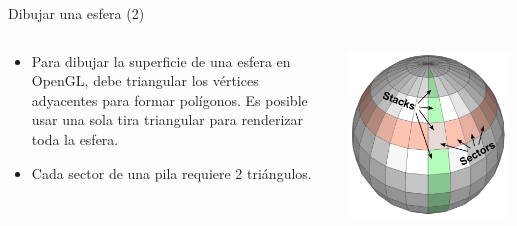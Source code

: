 \documentclass[aspectratio=169,compress]{beamer}
\begin{document}
\begin{frame}{Dibujar una esfera (2)}
\begin{columns}
\begin{column}{0.4\textwidth}
\begin{itemize}
\item Para dibujar la superficie de una esfera en OpenGL, debe triangular los vértices adyacentes para formar polígonos. Es posible usar una sola tira triangular para renderizar toda la esfera.
\item Cada sector de una pila requiere 2 triángulos.
\end{itemize}

\end{column}
\begin{column}{0.3\textwidth}
\begin{center}
 \includegraphics[width=0.98\textwidth]{FigsOpenGL/gl_sphere02}
 \end{center}


\end{column}
\end{columns}
\end{frame}
\end{document}
